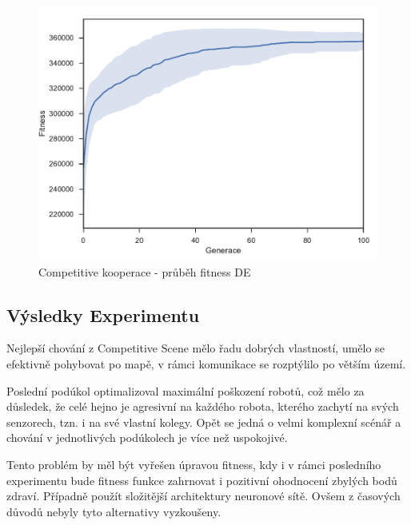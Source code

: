 \clearpage
\begin{figure}[h]\centering
	\includegraphics[width=\columnwidth]{../img/CompetitiveMap/CoopAgresive}
	\caption{Competitive kooperace - průběh fitness DE}
	\label{obr04:CompetitiveCoopAgresive}
\end{figure}
\newpage
\subsection*{Výsledky Experimentu}
 Nejlepší chování z Competitive Scene mělo řadu dobrých vlastností, umělo se efektivně pohybovat po mapě, v rámci komunikace se rozptýlilo po větším území. \par
 Poslední  podúkol optimalizoval maximální poškození robotů, což mělo za důsledek, že celé hejno je agresivní na každého robota, kterého zachytí na svých senzorech, tzn. i na své vlastní kolegy. Opět se jedná o velmi komplexní scénář a chování v jednotlivých podúkolech je více než uspokojivé.\par
Tento problém by měl být vyřešen úpravou fitness, kdy i v rámci posledního experimentu bude fitness funkce zahrnovat i pozitivní ohodnocení zbylých bodů zdraví. Případně použít složitější architektury neuronové sítě.  Ovšem z časových důvodů nebyly tyto alternativy vyzkoušeny. 
\par
 
